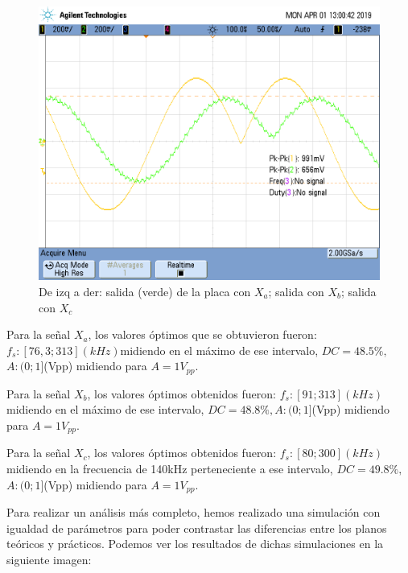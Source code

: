 \documentclass[../../ASSD_TP1_G7.tex]{subfiles}
\begin{document}
\begin{figure}[H]
\centering{}\includegraphics[scale=0.25]{Imagenes/ej_6_}\caption{De izq a der: salida (verde) de la placa con $X_{a}$; salida con
$X_{b}$; salida con $X_{c}$}
\end{figure}

Para la señal $X_{a}$, los valores óptimos que se obtuvieron fueron:
$f_{s}:[76,3;313](kHz)$midiendo en el máximo de ese intervalo, $DC=48.5\%,$$A:(0;1]$(Vpp)
midiendo para $A=1V_{pp}$.

Para la señal $X_{b}$, los valores óptimos obtenidos fueron: $f_{s}:[91;313](kHz)$midiendo
en el máximo de ese intervalo, $DC=48.8\%,$$A:(0;1]$(Vpp) midiendo
para $A=1V_{pp}$.

Para la señal $X_{c}$, los valores óptimos obtenidos fueron: $f_{s}:[80;300](kHz)$midiendo
en la frecuencia de 140kHz perteneciente a ese intervalo, $DC=49.8\%,$$A:(0;1]$(Vpp)
midiendo para $A=1V_{pp}$.

Para realizar un análisis más completo, hemos realizado una simulación
con igualdad de parámetros para poder contrastar las diferencias entre
los planos teóricos y prácticos. Podemos ver los resultados de dichas
simulaciones en la siguiente imagen:
\end{document}
